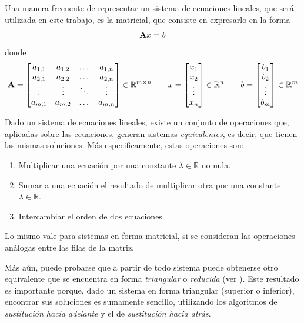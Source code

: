         Una manera frecuente de representar un sistema de ecuaciones lineales, que será utilizada en este trabajo, es la matricial, que consiste en expresarlo en la forma
        \[ \mathbf{A}x = b \]
        donde 
        \[ \mathbf{A} = \left[ \begin{matrix} a_{1,1} & a_{1,2} & \dots  & a_{1,n} \\
                                           a_{2,1} & a_{2,2} & \dots  & a_{2,n} \\
                                           \vdots  & \vdots  & \ddots & \vdots  \\
                                           a_{m,1} & a_{m,2} & \dots  & a_{m,n} \\ \end{matrix} \right] \in \mathbb{R}^{m \times n} \qquad
        x = \left[ \begin{matrix} x_1 \\ x_2 \\ \vdots \\ x_n \end{matrix} \right] \in \mathbb{R}^n \qquad
        b = \left[ \begin{matrix} b_1 \\ b_2 \\ \vdots \\ b_m \end{matrix} \right] \in \mathbb{R}^m \]

        Dado un sistema de ecuaciones lineales, existe un conjunto de operaciones que, aplicadas sobre las ecuaciones, generan sistemas \emph{equivalentes}, es decir, que tienen las mismas soluciones. Más especificamente, estas operaciones son:
        \begin{enumerate}[label=(\alph*), nosep]
            \item Multiplicar una ecuación por una constante $\lambda \in \mathbb{R}$ no nula.
            \item Sumar a una ecuación el resultado de multiplicar otra por una constante $\lambda \in \mathbb{R}$.
            \item Intercambiar el orden de dos ecuaciones.
        \end{enumerate}

        Lo mismo vale para sistemas en forma matricial, si se consideran las operaciones análogas entre las filas de la matriz.

        Más aún, puede probarse que a partir de todo sistema puede obtenerse otro equivalente que se encuentra en forma \emph{triangular} o \emph{reducida} (ver \cite[p.~358]{burden}). Este resultado es importante porque, dado un sistema en forma triangular (superior o inferior), encontrar sus soluciones es sumamente sencillo, utilizando los algoritmos de \emph{sustitución hacia adelante} y el de \emph{sustitución hacia atrás}.


